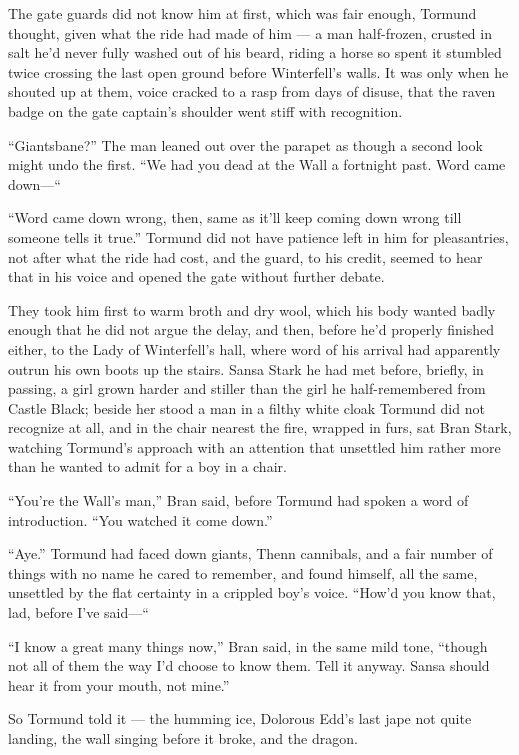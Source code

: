 The gate guards did not know him at first, which was fair enough, Tormund thought, given what the ride had made of him — a man half-frozen, crusted in salt he’d never fully washed out of his beard, riding a horse so spent it stumbled twice crossing the last open ground before Winterfell’s walls. It was only when he shouted up at them, voice cracked to a rasp from days of disuse, that the raven badge on the gate captain’s shoulder went stiff with recognition.

“Giantsbane?” The man leaned out over the parapet as though a second look might undo the first. “We had you dead at the Wall a fortnight past. Word came down—“

“Word came down wrong, then, same as it’ll keep coming down wrong till someone tells it true.” Tormund did not have patience left in him for pleasantries, not after what the ride had cost, and the guard, to his credit, seemed to hear that in his voice and opened the gate without further debate.

They took him first to warm broth and dry wool, which his body wanted badly enough that he did not argue the delay, and then, before he’d properly finished either, to the Lady of Winterfell’s hall, where word of his arrival had apparently outrun his own boots up the stairs. Sansa Stark he had met before, briefly, in passing, a girl grown harder and stiller than the girl he half-remembered from Castle Black; beside her stood a man in a filthy white cloak Tormund did not recognize at all, and in the chair nearest the fire, wrapped in furs, sat Bran Stark, watching Tormund’s approach with an attention that unsettled him rather more than he wanted to admit for a boy in a chair.

“You’re the Wall’s man,” Bran said, before Tormund had spoken a word of introduction. “You watched it come down.”

“Aye.” Tormund had faced down giants, Thenn cannibals, and a fair number of things with no name he cared to remember, and found himself, all the same, unsettled by the flat certainty in a crippled boy’s voice. “How’d you know that, lad, before I’ve said—“

“I know a great many things now,” Bran said, in the same mild tone, “though not all of them the way I’d choose to know them. Tell it anyway. Sansa should hear it from your mouth, not mine.”

So Tormund told it — the humming ice, Dolorous Edd’s last jape not quite landing, the wall singing before it broke, and the dragon.

